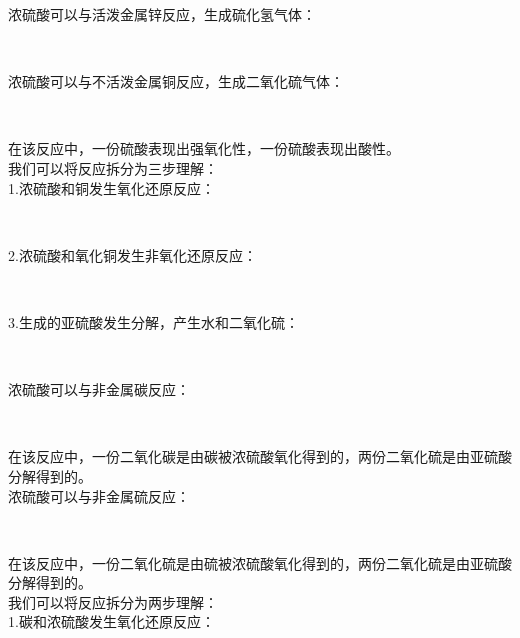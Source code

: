 \documentclass[UTF8]{ctexart}
\begin{document}
\newpage

    浓硫酸可以与活泼金属锌反应，生成硫化氢气体：
    \begin{center}
        \\[4mm]
    \end{center}
    浓硫酸可以与不活泼金属铜反应，生成二氧化硫气体：
    \begin{center}
        \\[4mm]
    \end{center}
    在该反应中，一份硫酸表现出强氧化性，一份硫酸表现出酸性。\\[3mm]
    我们可以将反应拆分为三步理解：\\[3mm]
    1.浓硫酸和铜发生氧化还原反应：
    \begin{center}
        \\[3mm]
    \end{center}
    2.浓硫酸和氧化铜发生非氧化还原反应：
    \begin{center}
        \\[3mm]
    \end{center}
    3.生成的亚硫酸发生分解，产生水和二氧化硫：
    \begin{center}
        \\[8mm]
    \end{center}
    浓硫酸可以与非金属碳反应：
    \begin{center}
        \\[3mm]
    \end{center}
    在该反应中，一份二氧化碳是由碳被浓硫酸氧化得到的，两份二氧化硫是由亚硫酸分解得到的。\\[5mm]
    浓硫酸可以与非金属硫反应：
    \begin{center}
        \\[3mm]
    \end{center}
    在该反应中，一份二氧化硫是由硫被浓硫酸氧化得到的，两份二氧化硫是由亚硫酸分解得到的。\\[5mm]
    我们可以将反应拆分为两步理解：\\[3mm]
    1.碳和浓硫酸发生氧化还原反应：
    \begin{center}
        \\[3mm]
    \end{center}
\end{document}

